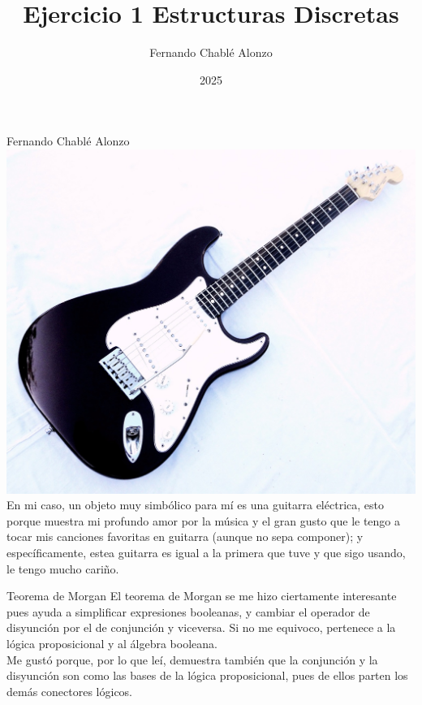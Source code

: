 \documentclass{beamer}
\title{Ejercicio 1 Estructuras Discretas}
\author{Fernando Chablé Alonzo}
\institute{Facultad de Ciencias}
\date{2025}
\begin{document}
\frame{\titlepage}

\begin{frame}{Fernando Chablé Alonzo}
\centering
\includegraphics[scale=0.1]{guitarra-electrica-fender-stratocoaster-american-standard-D_NQ_NP_632980-MLM25679231814_062017-F.jpg}\\
En mi caso, un objeto muy simbólico para mí es una guitarra eléctrica, esto porque muestra mi profundo amor por la música y el gran gusto que le tengo a tocar mis canciones favoritas en guitarra (aunque no sepa componer); y específicamente, estea guitarra es igual a la primera que tuve y que sigo usando, le tengo mucho cariño.
\end{frame}

\begin{frame}{Teorema de Morgan \cite{teoremamorgan}}
    El teorema de Morgan se me hizo ciertamente interesante pues ayuda a simplificar expresiones booleanas, y cambiar el operador de disyunción por el de conjunción y viceversa. Si no me equivoco, pertenece a la lógica proposicional y al álgebra booleana.\\
    Me gustó porque, por lo que leí, demuestra también que la conjunción y la disyunción son como las bases de la lógica proposicional, pues de ellos parten los demás conectores lógicos.
\end{frame}
\end{document}
